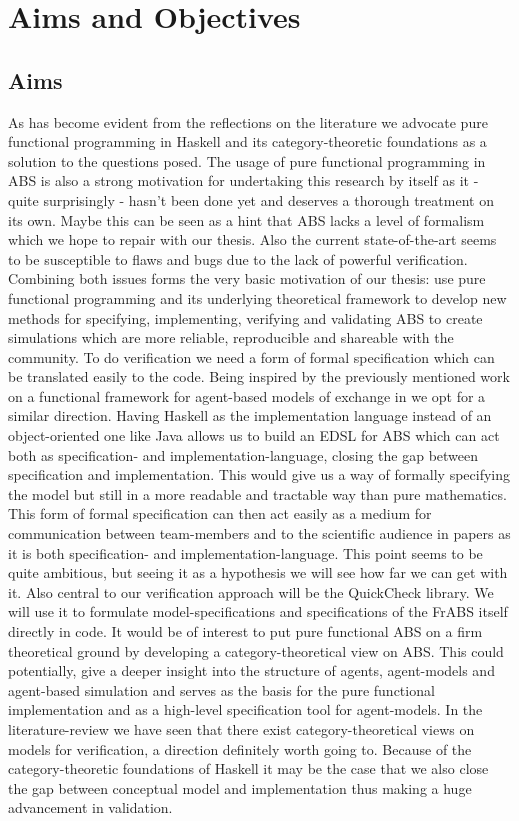 \chapter{Aims and Objectives}
\label{chap:aimsObj}

\section{Aims}
As has become evident from the reflections on the literature we advocate pure functional programming in Haskell and its category-theoretic foundations as a solution to the questions posed. The usage of pure functional programming in ABS is also a strong motivation for undertaking this research by itself as it - quite surprisingly - hasn't been done yet and deserves a thorough treatment on its own. Maybe this can be seen as a hint that ABS lacks a level of formalism which we hope to repair with our thesis. Also the current state-of-the-art seems to be susceptible to flaws and bugs due to the lack of powerful verification. Combining both issues forms the very basic motivation of our thesis: use pure functional programming and its underlying theoretical framework to develop new methods for specifying, implementing, verifying and validating ABS to create simulations which are more reliable, reproducible and shareable with the community.
To do verification we need a form of formal specification which can be translated easily to the code. Being inspired by the previously mentioned work on a functional framework for agent-based models of exchange in \cite{botta_functional_2011} we opt for a similar direction. Having Haskell as the implementation language instead of an object-oriented one like Java allows us to build an EDSL for ABS which can act both as specification- and implementation-language, closing the gap between specification and implementation. This would give us a way of formally specifying the model but still in a more readable and tractable way than pure mathematics. This form of formal specification can then act easily as a medium for communication between team-members and to the scientific audience in papers as it is both specification- and implementation-language. This point seems to be quite ambitious, but seeing it as a hypothesis we will see how far we can get with it. Also central to our verification approach will be the QuickCheck library. We will use it to formulate model-specifications and specifications of the FrABS itself directly in code. 
It would be of interest to put pure functional ABS on a firm theoretical ground by developing a category-theoretical view on ABS. This could potentially, give a deeper insight into the structure of agents, agent-models and agent-based simulation and serves as the basis for the pure functional implementation and as a high-level specification tool for agent-models. In the literature-review we have seen that there exist category-theoretical views on models for verification, a direction definitely worth going to. Because of the category-theoretic foundations of Haskell it may be the case that we also close the gap between conceptual model and implementation thus making a huge advancement in validation.
